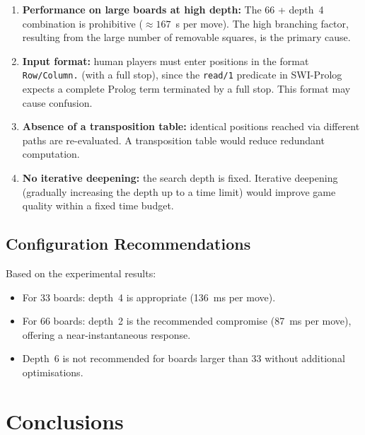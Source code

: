 \begin{enumerate}
  \item \textbf{Performance on large boards at high depth:}
        The 6{\texttimes}6 + depth~4 combination is prohibitive
        ($\approx 167$~s per move). The high branching factor,
        resulting from the large number of removable squares,
        is the primary cause.

  \item \textbf{Input format:} human players must enter positions
        in the format \texttt{Row/Column.}
        (with a full stop), since the \texttt{read/1} predicate in
        SWI-Prolog expects a complete Prolog term terminated by a full stop.
        This format may cause confusion.

  \item \textbf{Absence of a transposition table:} identical positions
        reached via different paths are re-evaluated.
        A transposition table would reduce redundant computation.

  \item \textbf{No iterative deepening:} the search depth is
        fixed. Iterative deepening (gradually increasing
        the depth up to a time limit) would improve game
        quality within a fixed time budget.
\end{enumerate}

\subsection{Configuration Recommendations}

Based on the experimental results:

\begin{itemize}
  \item For 3{\texttimes}3 boards: depth~4 is appropriate
        (136~ms per move).
  \item For 6{\texttimes}6 boards: depth~2 is the
        recommended compromise (87~ms per move),
        offering a near-instantaneous response.
  \item Depth~6 is not recommended for boards larger
        than 3{\texttimes}3 without additional optimisations.
\end{itemize}

\section{Conclusions}
\label{sec:conclusions}

